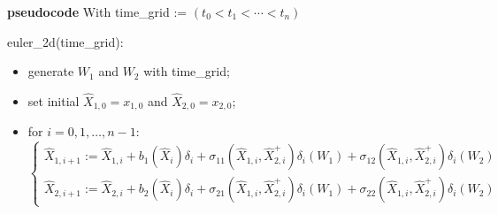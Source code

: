 \documentclass{article}
\begin{document}
{\bf pseudocode} 
With time\_grid := $(t_{0}< t_{1}<\cdots <t_{n})$

euler\_2d(time\_grid):
\begin{itemize}
 \item generate $W_{1}$ and $W_{2}$ with time\_grid;
 \item set initial $\hat X_{1,0} = x_{1,0}$ and $\hat X_{2,0} = x_{2,0}$;
 \item for $i = 0, 1, \ldots, n-1$: \\
 $$
\left\{
\begin{array}
 {ll}
 \hat X_{1, i+1} := 
 \hat X_{1, i} + b_{1}(\hat X_{i}) \delta_{i} + 
 \sigma_{11} (\hat X_{1,i}, \hat X_{2,i}^{+}) \delta_{i} (W_{1}) + 
 \sigma_{12}(\hat X_{1,i}, \hat X_{2,i}^{+}) \delta_{i} (W_{2}) \\
  \hat X_{2, i+1} := 
 \hat X_{2, i} + b_{2}(\hat X_{i}) \delta_{i} + 
 \sigma_{21} (\hat X_{1,i}, \hat X_{2,i}^{+}) \delta_{i} (W_{1}) + 
 \sigma_{22}(\hat X_{1,i}, \hat X_{2,i}^{+}) \delta_{i} (W_{2}) 
\end{array}
\right.
$$
\end{itemize}









%
%

\end{document}
